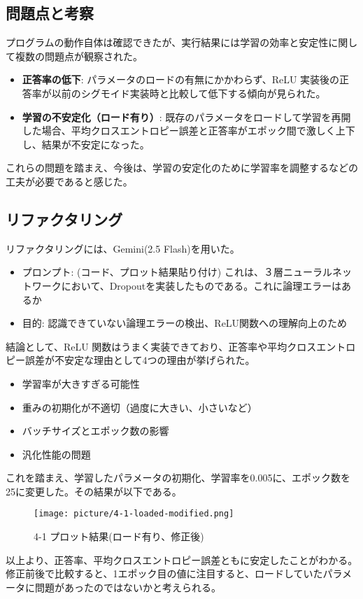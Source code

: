 \documentclass[11px,a4,dvipdfmx]{jsarticle}
\begin{document}
\subsection{問題点と考察}
プログラムの動作自体は確認できたが、実行結果には学習の効率と安定性に関して複数の問題点が観察された。

\begin{itemize}
	\item \textbf{正答率の低下}: パラメータのロードの有無にかかわらず、ReLU 実装後の正答率が以前のシグモイド実装時と比較して低下する傾向が見られた。
	\item \textbf{学習の不安定化（ロード有り）}: 既存のパラメータをロードして学習を再開した場合、平均クロスエントロピー誤差と正答率がエポック間で激しく上下し、結果が不安定になった。
\end{itemize}
これらの問題を踏まえ、今後は、学習の安定化のために学習率を調整するなどの工夫が必要であると感じた。

\subsection{リファクタリング}
リファクタリングには、Gemini(2.5 Flash)を用いた。
\begin{itemize}
    \item プロンプト: (コード、プロット結果貼り付け) これは、３層ニューラルネットワークにおいて、Dropoutを実装したものである。これに論理エラーはあるか
    \item 目的: 認識できていない論理エラーの検出、ReLU関数への理解向上のため
\end{itemize}
結論として、ReLU 関数はうまく実装できており、正答率や平均クロスエントロピー誤差が不安定な理由として4つの理由が挙げられた。
\begin{itemize}
    \item 学習率が大きすぎる可能性
    \item 重みの初期化が不適切（過度に大きい、小さいなど）
    \item バッチサイズとエポック数の影響
    \item 汎化性能の問題
\end{itemize}
これを踏まえ、学習したパラメータの初期化、学習率を0.005に、エポック数を25に変更した。その結果が以下である。
 \begin{figure}[H]
		      \begin{center}
			      \texttt{[image: picture/4-1-loaded-modified.png]}
			      \caption{4-1 プロット結果(ロード有り、修正後)}
		      \end{center}
\end{figure}
以上より、正答率、平均クロスエントロピー誤差ともに安定したことがわかる。修正前後で比較すると、1エポック目の値に注目すると、ロードしていたパラメータに問題があったのではないかと考えられる。
\end{document}
